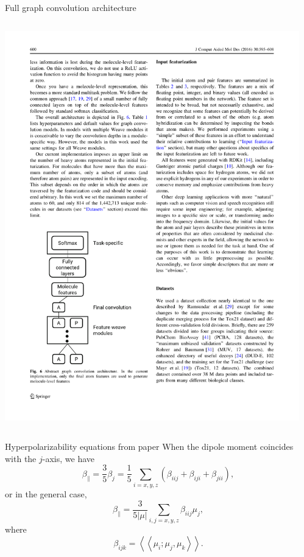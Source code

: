 \documentclass[xetex,compress]{beamer}
\begin{document}
\begin{frame}{Full graph convolution architecture}
  \begin{columns}
    \begin{column}{0.50\textwidth}
      \includegraphics[width=1.00\textwidth]{./figures/gc_fig6.pdf}
    \end{column}
    \begin{column}{0.50\textwidth}
    \end{column}
  \end{columns}
\end{frame}

\begin{frame}{Hyperpolarizability equations from paper}
  When the dipole moment coincides with the \(j\)-axis, we have
  \begin{equation*}
    \beta_{\parallel} = \frac{3}{5}\beta_j = \frac{1}{5} \sum_{i=x,y,z} (\beta_{iij} + \beta_{iji} + \beta_{jii}),
  \end{equation*}
  or in the general case,
  \begin{equation*}
    \beta_{\parallel} = \frac{3}{5|\mu|} \sum_{i,j=x,y,z} \beta_{iij} \mu_{j},
  \end{equation*}
  where
  \begin{equation*}
    \beta_{ijk} = \left<\left<\mu_{i};\mu_{j},\mu_{k}\right>\right>.
  \end{equation*}
\end{frame}
\end{document}
